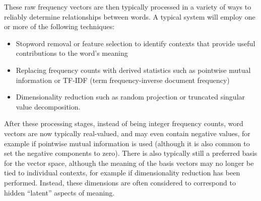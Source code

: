\documentclass[preprint,leqno]{elsarticle}
\begin{document}
These raw frequency vectors are then typically processed in a variety
of ways to reliably determine relationships between words. A typical
system will employ one or more of the following techniques:
\begin{itemize}
\item Stopword removal or feature selection to identify contexts that
  provide useful contributions to the word's meaning
\item Replacing frequency counts with derived statistics such as
  pointwise mutual information or TF-IDF (term frequency-inverse
  document frequency)
\item Dimensionality reduction such as random projection or truncated
  singular value decomposition.
\end{itemize}
After these processing stages, instead of being integer frequency
counts, word vectors are now typically real-valued, and may even
contain negative values, for example if pointwise mutual information
is used (although it is also common to set the negative components to
zero). There is also typically still a preferred basis for the vector
space, although the meaning of the basis vectors may no longer be tied
to individual contexts, for example if dimensionality reduction has
been performed. Instead, these dimensions are often considered to
correspond to hidden ``latent'' aspects of meaning.
\end{document}
